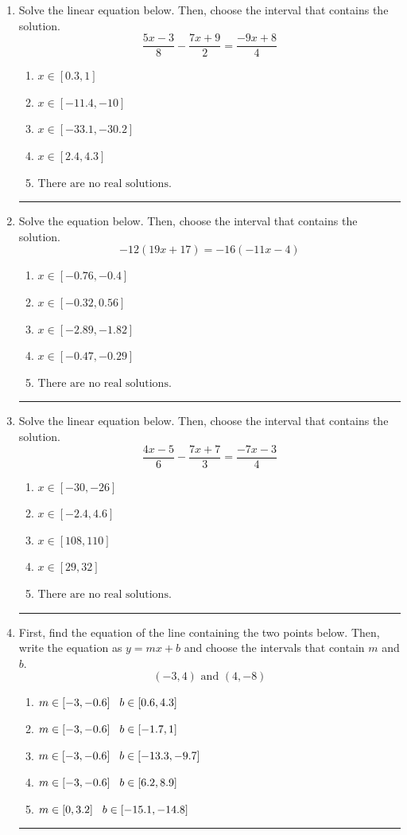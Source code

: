 \documentclass[14pt]{extbook}
\newcommand{\litem}[1]{\item#1\hspace*{-1cm}\rule{\textwidth}{0.4pt}}
\begin{document}
\begin{enumerate}
{\begin{enumerate}[label=\Alph*.]
\end{enumerate} }
\litem{
Solve the linear equation below. Then, choose the interval that contains the solution.\[ \frac{5x -3}{8} - \frac{7x + 9}{2} = \frac{-9x + 8}{4} \]\begin{enumerate}[label=\Alph*.]
\item \( x \in [0.3, 1] \)
\item \( x \in [-11.4, -10] \)
\item \( x \in [-33.1, -30.2] \)
\item \( x \in [2.4, 4.3] \)
\item \( \text{There are no real solutions.} \)

\end{enumerate} }
\litem{
Solve the equation below. Then, choose the interval that contains the solution.\[ -12(19x + 17) = -16(-11x -4) \]\begin{enumerate}[label=\Alph*.]
\item \( x \in [-0.76, -0.4] \)
\item \( x \in [-0.32, 0.56] \)
\item \( x \in [-2.89, -1.82] \)
\item \( x \in [-0.47, -0.29] \)
\item \( \text{There are no real solutions.} \)

\end{enumerate} }
\litem{
Solve the linear equation below. Then, choose the interval that contains the solution.\[ \frac{4x -5}{6} - \frac{7x + 7}{3} = \frac{-7x -3}{4} \]\begin{enumerate}[label=\Alph*.]
\item \( x \in [-30, -26] \)
\item \( x \in [-2.4, 4.6] \)
\item \( x \in [108, 110] \)
\item \( x \in [29, 32] \)
\item \( \text{There are no real solutions.} \)

\end{enumerate} }
\litem{
First, find the equation of the line containing the two points below. Then, write the equation as $ y=mx+b $ and choose the intervals that contain $m$ and $b$.\[ (-3, 4) \text{ and } (4, -8) \]\begin{enumerate}[label=\Alph*.]
\item \( m \in [-3, -0.6] \hspace*{3mm} b \in [0.6, 4.3] \)
\item \( m \in [-3, -0.6] \hspace*{3mm} b \in [-1.7, 1] \)
\item \( m \in [-3, -0.6] \hspace*{3mm} b \in [-13.3, -9.7] \)
\item \( m \in [-3, -0.6] \hspace*{3mm} b \in [6.2, 8.9] \)
\item \( m \in [0, 3.2] \hspace*{3mm} b \in [-15.1, -14.8] \)

\end{enumerate} }
\end{enumerate}
\end{document}

